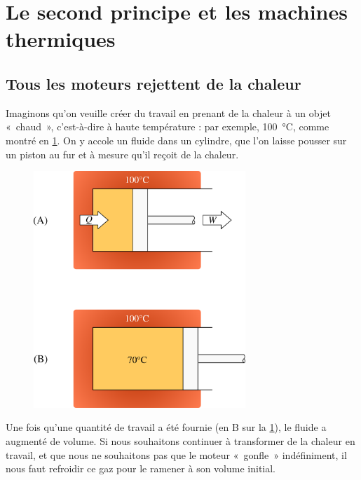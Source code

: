 \section{Le second principe et les machines thermiques}
\label{ch_second_principe_machines_thermiques}

	\subsection{Tous les moteurs rejettent de la chaleur}
	\label{ch_demo_second_principe}

		Imaginons qu’on veuille créer du travail en prenant de la chaleur à un objet «~chaud~», c’est-à-dire à haute température : par exemple, \SI{100}{\degreeCelsius}, comme montré en \cref{fig_démo_second_principe_1}. On y accole un fluide dans un cylindre, que l’on laisse pousser sur un piston au fur et à mesure qu’il reçoit de la chaleur.

		\begin{figure}
			\begin{center}
				\includegraphics[width=8cm]{images/demo_second_principe_1.png}
			\end{center}
			\label{fig_démo_second_principe_1}
		\end{figure}

		Une fois qu’une quantité de travail a été fournie (en B sur la \cref{fig_démo_second_principe_1}), le fluide a augmenté de volume. Si nous souhaitons continuer à transformer de la chaleur en travail, et que nous ne souhaitons pas que le moteur «~gonfle~» indéfiniment, il nous faut refroidir ce gaz pour le ramener à son volume initial.

